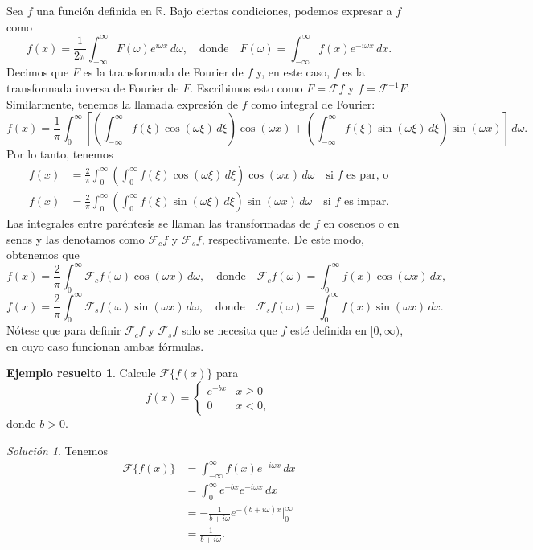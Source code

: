 \documentclass[11pt,letterpaper,draft]{report}
\theoremstyle{plain}
\theoremstyle{definition}
\newtheorem{solved}[theorem]{Ejemplo resuelto}
\theoremstyle{remark}
\newtheorem*{solution}{Solución}
\newcommand\R{\mathbb R}
\newcommand\<{\langle}
\renewcommand\>{\rangle}
\let\cal\mathcal
\begin{document}
Sea $f$ una función definida en $\R$.
Bajo ciertas condiciones, podemos expresar a $f$ como
\[
  f(x)
  =
  \frac{1}{2\pi}\int_{-\infty}^{\infty}
  F(\omega)e^{i\omega x}\,d\omega,
  \quad
  \text{donde}
  \quad
  F(\omega)
  = \int_{-\infty}^{\infty}f(x)e^{-i\omega x}\,dx
.\]
Decimos que $F$ es la transformada de Fourier de $f$ y, en este caso,
$f$ es la transformada inversa de Fourier de $F$. Escribimos esto como
$F=\cal Ff$ y $f=\cal F^{-1}F$.
Similarmente, tenemos la llamada expresión de $f$ como integral de
Fourier:
\[
  f(x)=
  \frac{1}{\pi}
  \int_{0}^{\infty}
  \left[
    \left(
    \int_{-\infty}^{\infty}f(\xi)\cos(\omega\xi)\,d\xi
    \right)
    \cos(\omega x)
    +
    \left(
      \int_{-\infty}^{\infty}f(\xi)\sin(\omega\xi)\,d\xi
    \right)
    \sin(\omega x)
  \right]
  \,d\omega
.\]
Por lo tanto, tenemos
\begin{align*}
  f(x)
  &=
  \frac{2}{\pi}
  \int_{0}^{\infty}
    \left(
    \int_{0}^{\infty}f(\xi)\cos(\omega\xi)\,d\xi
    \right)
    \cos(\omega x)
  \,d\omega
  \quad
  \text{si $f$ es par, o} \\
  f(x)
  &=
  \frac{2}{\pi}
  \int_{0}^{\infty}
    \left(
      \int_{0}^{\infty}f(\xi)\sin(\omega\xi)\,d\xi
    \right)
    \sin(\omega x)
  \,d\omega
  \quad
  \text{si $f$ es impar.}
\end{align*}
Las integrales entre paréntesis se llaman las transformadas de $f$ en
cosenos o en senos y las denotamos como $\cal F_cf$ y $\cal F_sf$,
respectivamente. De este modo, obtenemos que
\[
  f(x)
  =
  \frac{2}{\pi}
  \int_{0}^{\infty}\cal F_cf(\omega)\cos(\omega x)\,d\omega,
  \quad
  \text{donde}
  \quad
  \cal F_cf(\omega)
  =
  \int_{0}^{\infty}f(x)\cos(\omega x)\,dx
,\]
\[
  f(x)
  =
  \frac{2}{\pi}
  \int_{0}^{\infty}\cal F_sf(\omega)\sin(\omega x)\,d\omega,
  \quad
  \text{donde}
  \quad
  \cal F_sf(\omega)
  =
  \int_{0}^{\infty}f(x)\sin(\omega x)\,dx
.\]
Nótese que para definir $\cal F_cf$ y $\cal F_sf$ solo se necesita que
$f$ esté definida en $[0,\infty)$, en cuyo caso funcionan ambas
fórmulas.

\begin{solved}
  Calcule $\cal F\{f(x)\}$ para
  \[
    f(x)=
    \begin{cases}
      e^{-bx} & x\geq 0 \\
      0 & x<0,
    \end{cases}
  \]
  donde $b>0$.
  \begin{solution}
    Tenemos
    \begin{align*}
      \cal F\{f(x)\}
      &= \int_{-\infty}^{\infty}f(x)e^{-i\omega x}\,dx \\
      &= \int_{0}^{\infty}e^{-bx}e^{-i\omega x}\,dx \\
      &= -\frac{1}{b+i\omega}e^{-(b+i\omega)x}\Big|_{0}^{\infty} \\
      &= \frac{1}{b+i\omega}.
    \end{align*}
  \end{solution}
\end{solved}
\end{document}
